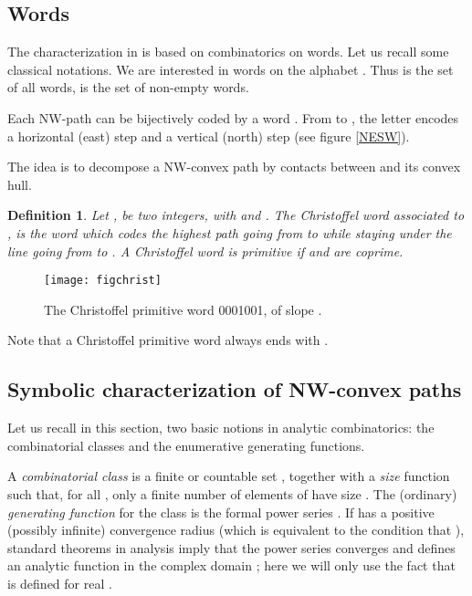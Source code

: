 \documentclass{article}
\newtheorem{definition}[theorem]{Definition}
\begin{document}
\subsection{Words}
The characterization in \cite{Brlek09a} is based on
combinatorics on words. Let us recall some classical notations.
We are interested in words on the alphabet .  Thus
 is the set of all words,  is the set of
non-empty words. 


Each NW-path can be bijectively coded by a word . From  to , the letter  encodes a horizontal (east) step and  a
vertical (north) step (see figure \ref{NESW}).


The idea is to decompose a NW-convex path  by contacts between  and its convex hull.


\begin{definition}
Let ,  be two integers, with  and  . The Christoffel word associated to ,  is the word which codes the highest path going from  to  while staying under the line going from  to . 
A Christoffel word is primitive if  and  are coprime. \end{definition}
\vspace{-0.6cm}
\begin{figure}
\begin{center}
\texttt{[image: figchrist]}
\end{center}
\caption{The Christoffel primitive word 0001001, of slope .}
\label{dessinchrist}
\end{figure}
\vspace{-0.4cm}
Note that a Christoffel primitive word always ends with . 


\subsection{Symbolic characterization of NW-convex paths}

Let us recall in this section, two basic notions in analytic combinatorics: the combinatorial classes and the enumerative generating functions.

A \emph{combinatorial class} is a finite or countable set
, together with a \emph{size} function  such that, for all ,
only a finite number  of elements of  have size .
The (ordinary) \emph{generating function}  for the class
 is the formal power series . If  has a positive
(possibly infinite) convergence radius  (which is equivalent to
the condition that ), standard
theorems in analysis imply that the power series  converges and
defines an analytic function in the complex domain ; here we
will only use the fact that  is defined for real .
\end{document}
